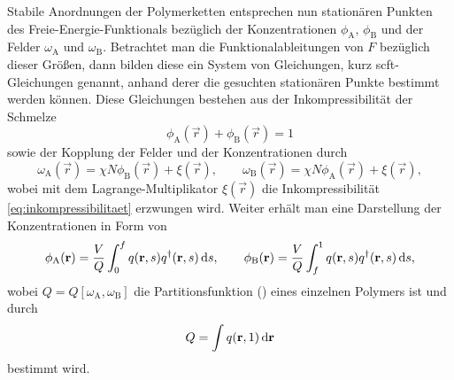 \documentclass[../main.tex]{subfiles}
\begin{document}
Stabile Anordnungen der Polymerketten entsprechen nun stationären Punkten des Freie-Energie-Funktionals bezüglich der Konzentrationen $\phi_{\mathrm{A}}$, $\phi_{\mathrm{B}}$ und der Felder $\omega_{\mathrm{A}}$ und $\omega_{\mathrm{B}}$.
Betrachtet man die Funktionalableitungen von $F$ bezüglich dieser Größen, dann bilden diese ein System von Gleichungen, kurz \ac{scft}-Gleichungen genannt, anhand derer die gesuchten stationären Punkte bestimmt werden können.
Diese Gleichungen bestehen aus der Inkompressibilität der Schmelze
\begin{equation}
\label{eq:inkompressibilitaet}
    \phi_{\mathrm{A}}(\vec{r}) + \phi_{\mathrm{B}}(\vec{r}) = 1
\end{equation}%
sowie der Kopplung der Felder und der Konzentrationen durch
\begin{equation}
\label{eq:felder}
    \omega_{\mathrm{A}}(\vec{r}) = \chi N \phi_{\mathrm{B}}(\vec{r}) + \xi(\vec{r}), \qquad
    \omega_{\mathrm{B}}(\vec{r}) = \chi N \phi_{\mathrm{A}}(\vec{r}) + \xi(\vec{r}),
\end{equation}%
wobei mit dem Lagrange-Multiplikator $\xi(\vec{r})$ die Inkompressibilität \cref{eq:inkompressibilitaet} erzwungen wird.
Weiter erhält man eine Darstellung der Konzentrationen in Form von
\begin{equation}
\label{eq:konzentrationen}
    \phi_{\mathrm{A}}(\mathbf{r}) = \frac{V}{Q} \int_{0}^{f} q(\mathbf{r}, s) q^{\dagger}(\mathbf{r}, s) \mathop{}\!\mathrm{d} s, \qquad
    \phi_{\mathrm{B}}(\mathbf{r}) = \frac{V}{Q} \int_{f}^{1} q(\mathbf{r}, s) q^{\dagger}(\mathbf{r}, s) \mathop{}\!\mathrm{d} s,
\end{equation}%
wobei $Q = Q[\omega_{\mathrm{A}}, \omega_{\mathrm{B}}]$ die Partitionsfunktion () eines einzelnen Polymers ist und durch
\begin{equation}
\label{eq:partitionsfunktion}
    Q = \int q(\mathbf{r}, 1) \mathop{}\!\mathrm{d} \mathbf{r}
\end{equation}%
bestimmt wird.
\end{document}
